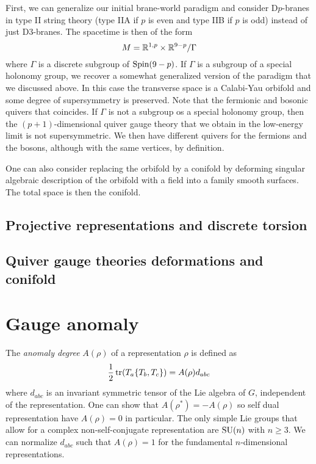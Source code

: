 \documentclass[a4paper,10pt]{article}
\begin{document}
        First, we can generalize our initial brane-world paradigm and consider D$p$-branes in type II string theory (type IIA if $p$ is even and type IIB if $p$ is odd) instead of just D$3$-branes. The spacetime is then of the form
        \begin{equation}
            M = \mathbb{R}^{1,p}\times\mathbb{R}^{9-p}/\Gamma
        \end{equation}
        where $\Gamma$ is a discrete subgroup of $\text{Spin}(9-p)$. If $\Gamma$ is a subgroup of a special holonomy group, we recover a somewhat generalized version of the paradigm that we discussed above. In this case the transverse space is a Calabi-Yau orbifold and some degree of supersymmetry is preserved. Note that the fermionic and bosonic quivers that coincides. If $\Gamma$ is not a subgroup os a special holonomy group, then the $(p+1)$-dimensional quiver gauge theory that we obtain in the low-energy limit is not supersymmetric. We then have different quivers for the fermions and the bosons, although with the same vertices, by definition.

        One can also consider replacing the orbifold by a conifold by deforming singular algebraic description of the orbifold with a field into a family smooth surfaces. The total space is then the conifold.

    \subsection{Projective representations and discrete torsion}

    \subsection{Quiver gauge theories deformations and conifold}

\pagebreak
\appendix

\section{Gauge anomaly}\label{sec:anomalies}

    The \emph{anomaly degree} $A(\rho)$ of a representation $\rho$ is defined as
    \begin{equation}
        \frac{1}{2}\tr(T_a\{T_b,T_c\})=A(\rho)d_{abc}
    \end{equation}
    where $d_{abc}$ is an invariant symmetric tensor of the Lie algebra of $G$, independent of the representation. One can show that $A(\rho^*)=-A(\rho)$ so self dual representation have $A(\rho)=0$ in particular. The only simple Lie groups that allow for a complex non-self-conjugate representation are $\text{SU}(n)$ with $n\geq3$. We can normalize $d_{abc}$ such that $A(\rho)=1$ for the fundamental $n$-dimensional representations.
\end{document}
